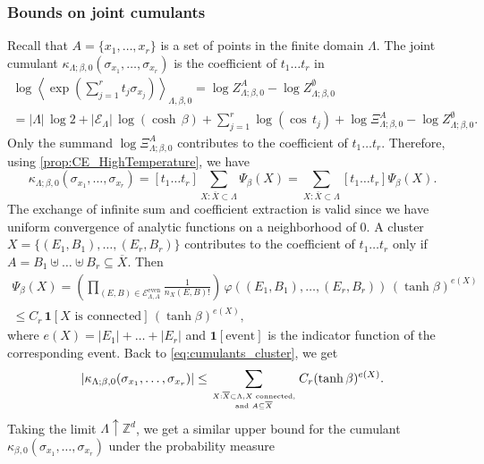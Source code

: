 \documentclass{amsart}
\newcommand{\field}[1]{\mathbb{#1}}
\newcommand{\Z}{\field{Z}}
\def\ka{\kappa}
\def\One{\bm{1}}
\def\EEE{\mathcal{E}}
\numberwithin{equation}{section}
\theoremstyle{remark}
\begin{document}
\subsubsection{Bounds on joint cumulants}
\label{SectBoundHT}
Recall that $A=\{x_1,\dots,x_r\}$ is a set of points in the finite domain $\Lambda$.
The joint cumulant $\ka_{\Lambda;\beta,0}(\sigma_{x_1},\dots,\sigma_{x_r})$ is
 the coefficient of $t_1 \dots t_r$ in
\begin{multline*}
 \log \left\langle \exp\left(\sum_{j=1}^r t_j \sigma_{x_j} \right) \right\rangle_{\Lambda,\beta,0}
=\log Z^A_{\Lambda; \beta,0}  - \log Z^\emptyset_{\Lambda; \beta,0} \\
= |\Lambda|\, \log 2 + |\EEE_\Lambda| \, \log(\cosh\, \beta)
+\sum_{j=1}^r  \log (\cos\, t_j) + \log \Xi^A_{\Lambda;\beta,0}
-  \log Z^\emptyset_{\Lambda; \beta,0}.
\end{multline*}
Only the summand $\log \Xi^A_{\Lambda;\beta,0}$ contributes to the coefficient of $t_1 \dots t_r$.
Therefore, using \cref{prop:CE_HighTemperature}, we have
\begin{equation}
\label{eq:cumulants_cluster}
\ka_{\Lambda;\beta,0}(\sigma_{x_1},\dots,\sigma_{x_r}) = [t_1 \dots t_r] \sum_{X: \overline{X} \subset \Lambda} \Psi_{\beta}(X)
=  \sum_{X: \overline{X} \subset \Lambda}  [t_1 \dots t_r]  \Psi_{\beta}(X).
\end{equation}
The exchange of infinite sum and coefficient extraction is valid 
since we have uniform convergence of analytic functions on a neighborhood of $0$.
A cluster $X=\{(E_1,B_1),\dots,(E_r,B_r)\}$ contributes to the coefficient of $t_1 \dots t_r$
only if $A=B_1 \uplus \dots \uplus B_r \subseteq \overline{X}$.
Then 
\begin{multline*} [t_1 \dots t_r]  \Psi_{\beta}(X) = 
\left( \prod_{(E,B) \in \mathcal{E}^\text{even}_{\Lambda,A}}
 \frac{1}{n_X(E,B)!} \right)  \, \varphi((E_1,B_1),\dots,(E_r,B_r)) \, (\tanh \beta)^{e(X)}\\
 \le C_r \, \One[X \text{ is connected}] \, (\tanh \beta)^{e(X)},
 \end{multline*}
 where $e(X)=|E_1|+\dots+|E_r|$ and $\One[\text{event}]$ is the indicator function of the corresponding event.
 Back to \cref{eq:cumulants_cluster}, we get
 \[|\ka_{\Lambda;\beta,0}(\sigma_{x_1},\dots,\sigma_{x_r}) | \le
  \sum_{X: \overline{X} \subset \Lambda, X\text{ connected,}\atop \text{and } A \subseteq \overline{X}}
  C_r (\tanh \beta)^{e(X)}.\]
  Taking the limit $\Lambda \uparrow \Z^d$, we get a similar upper bound for the cumulant
  $\ka_{\beta,0}(\sigma_{x_1},\dots,\sigma_{x_r})$ under the probability measure 
\end{document}
